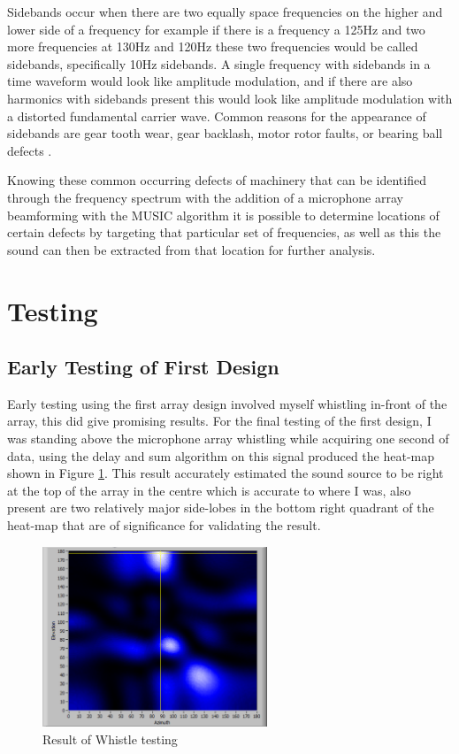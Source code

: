 \documentclass{UoNMCHA}
\numberwithin{equation}{section}
\begin{document}
Sidebands occur when there are two equally space frequencies on the higher and lower side of a frequency for example if there is a frequency a 125Hz and two more frequencies at 130Hz and 120Hz these two frequencies would be called sidebands, specifically 10Hz sidebands. A single frequency with sidebands in a time waveform would look like amplitude modulation, and if there are also harmonics with sidebands present this would look like amplitude modulation with a distorted fundamental carrier wave. Common reasons for the appearance of sidebands are gear tooth wear, gear backlash, motor rotor faults, or bearing ball defects \citep{Mob20}.

Knowing these common occurring defects of machinery that can be identified through the frequency spectrum with the addition of a microphone array beamforming with the MUSIC algorithm it is possible to determine locations of certain defects by targeting that particular set of frequencies, as well as this the sound can then be extracted from that location for further analysis. 

\newpage
\section{Testing} \label{sec:Lab Testing}
\subsection{Early Testing of First Design} \label{sec:First Array Testing}
    Early testing using the first array design involved myself whistling in-front of the array, this did give promising results. For the final testing of the first design, I was standing above the microphone array whistling while acquiring one second of data, using the delay and sum algorithm on this signal produced the heat-map shown in Figure \ref{fig:RealWhistle}. This result accurately estimated the sound source to be right at the top of the array in the centre which is accurate to where I was, also present are two relatively major side-lobes in the bottom right quadrant of the heat-map that are of significance for validating the result.
    
    \begin{figure} [H]
        \centering
        \includegraphics[keepaspectratio, width = 0.6\textwidth]{Figures/RealWhistle.png}
        \caption{Result of Whistle testing}
        \label{fig:RealWhistle}
    \end{figure}
    
\end{document}
